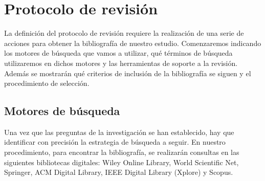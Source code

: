 \section{Protocolo de revisión}

La definición del protocolo de revisión requiere la realización de una serie de acciones para obtener la bibliografía de nuestro estudio. Comenzaremos indicando los motores de búsqueda que vamos a utilizar, qué términos de búsqueda utilizaremos en dichos motores y las herramientas de soporte a la revisión. Además se mostrarán qué criterios de inclusión de la bibliografía se siguen y el procedimiento de selección.

\subsection{Motores de búsqueda}
Una vez que las preguntas de la investigación se han establecido, hay que identificar con precisión la estrategia de búsqueda a seguir. En nuestro procedimiento, para encontrar la bibliografía, se realizarán consultas en las siguientes bibliotecas digitales: Wiley Online Library, World Scientific Net, Springer, ACM Digital Library, IEEE Digital Library (Xplore) y Scopus.

